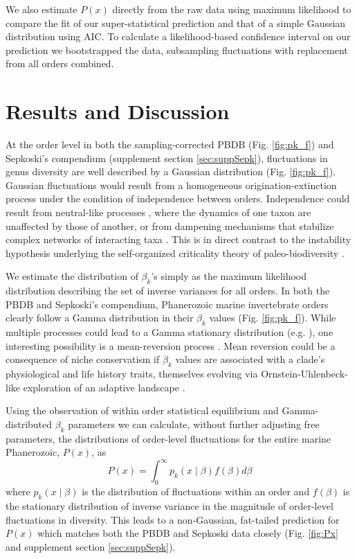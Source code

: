 We also estimate $P(x)$ directly from the raw data using maximum
likelihood to compare the fit of our super-statistical prediction and
that of a simple Gaussian distribution using AIC. To calculate a
likelihood-based confidence interval on our prediction we bootstrapped
the data, subsampling fluctuations with replacement from all orders
combined.

\section{Results and Discussion}
At the order level in both the sampling-corrected PBDB
(Fig. \ref{fig:pk_f}) and Sepkoski's compendium (supplement section
\ref{sec:suppSepk}), fluctuations in genus diversity are well
described by a Gaussian distribution (Fig. \ref{fig:pk_f}). Gaussian
fluctuations would result from a homogeneous origination-extinction
process under the condition of independence between
orders. Independence could result from neutral-like processes
\cite{hubbell2001}, where the dynamics of one taxon are unaffected by
those of another, or from dampening mechanisms that stabilize complex
networks of interacting taxa \cite{brose2005}. This is in direct
contrast to the instability hypothesis underlying the self-organized
criticality theory of paleo-biodiversity \cite{bak1993, sole1997}.

We estimate the distribution of $\beta_k$'s simply as the maximum
likelihood distribution describing the set of inverse variances for
all orders. In both the PBDB and Sepkoski's compendium, Phanerozoic
marine invertebrate orders clearly follow a Gamma distribution in
their $\beta_k$ values (Fig. \ref{fig:pk_f}).  While multiple
processes could lead to a Gamma stationary distribution (e.g.
  \cite{cir1985}), one interesting possibility is a mean-reversion
process \cite{cir1985}. Mean reversion could be a consequence of
niche conservatism if $\beta_k$ values are associated with a clade's
physiological and life history traits, themselves evolving via
Ornstein-Uhlenbeck-like exploration of an adaptive landscape
\cite{cir1985, butler2004}.

Using the observation of within order statistical equilibrium and
Gamma-distributed $\beta_k$ parameters we can calculate, without
further adjusting free parameters, the distributions of order-level
fluctuations for the entire marine Phanerozoic, $P(x)$, as
\begin{equation}
  P(x) = \int_0^\infty p_k(x \mid \beta) f(\beta) d\beta \label{eq:PxInt}
\end{equation}
where $p_k(x \mid \beta)$ is the distribution of fluctuations within
an order and $f(\beta)$ is the stationary distribution of inverse
variance in the magnitude of order-level fluctuations in
diversity. This leads to a non-Gaussian, fat-tailed prediction for
$P(x)$ which matches both the PBDB and Sepkoski data closely
(Fig. \ref{fig:Px} and supplement section \ref{sec:suppSepk}).

